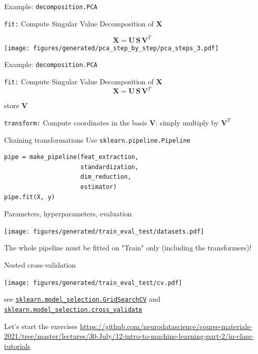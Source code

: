 \documentclass[presentation,mathserif,table]{beamer}
\newcommand{\X}{{\mathbold X}}
\newcommand{\bS}{{\mathbold S}}
\newcommand{\U}{{\mathbold U}}
\newcommand{\V}{{\mathbold V}}
\begin{document}
\begin{frame}[label={sec:orgf3aac6e},fragile]{Example: \texttt{decomposition.PCA}}
 \begin{block}{\texttt{fit:}}
Compute Singular Value Decomposition of \(\X\)
\begin{structureenv} %
\begin{equation}
\X = \U \, \bS \, \V^T
\end{equation}
\texttt{[image: figures/generated/pca\_step\_by\_step/pca\_steps\_3.pdf]}
\end{structureenv}
\end{block}
\end{frame}

\begin{frame}[label={sec:orga8b23d6},fragile]{Example: \texttt{decomposition.PCA}}
 \begin{block}{\texttt{fit:}}
Compute Singular Value Decomposition of \(\X\)
\begin{equation*}
\X = \U \, \bS \, \V^T
\end{equation*}

store \(\V\)
\end{block}
\begin{block}{\texttt{transform:}}
Compute coordinates in the basis \(\V\): simply multiply by \(\V^T\)
\end{block}
\end{frame}
\begin{frame}[label={sec:org9ef39fb},fragile]{Chaining transformations}
 Use \texttt{sklearn.pipeline.Pipeline}

\begin{verbatim}
pipe = make_pipeline(feat_extraction,
                     standardization,
                     dim_reduction,
                     estimator)
pipe.fit(X, y)
\end{verbatim}
\end{frame}
\begin{frame}[label={sec:org0c93629}]{Parameters, hyperparameters, evaluation}
\begin{center}
\texttt{[image: figures/generated/train\_eval\_test/datasets.pdf]}
\end{center}
The whole pipeline must be fitted on "Train" only (including the transformers)!
\end{frame}
\begin{frame}[label={sec:org2958f85},fragile]{Nested cross-validation}
 \begin{center}
\texttt{[image: figures/generated/train\_eval\_test/cv.pdf]}
\end{center}
see  \href{https://scikit-learn.org/stable/modules/generated/sklearn.model\_selection.GridSearchCV.html}{\texttt{sklearn.model\_selection.GridSearchCV}}
and  \href{https://scikit-learn.org/stable/modules/generated/sklearn.model\_selection.GridSearchCV.html}{\texttt{sklearn.model\_selection.cross\_validate}}
\end{frame}
\begin{frame}[label={sec:orgc23a66e}]{Let's start the exercises}
\url{https://github.com/neurodatascience/course-materials-2021/tree/master/lectures/30-July/12-intro-to-machine-learning-part-2/in-class-tutorials}
\end{frame}
\end{document}
